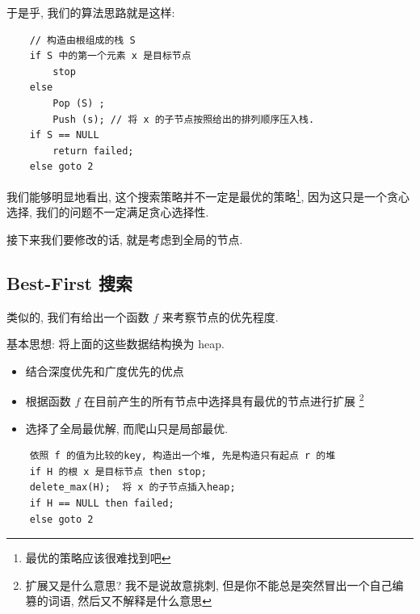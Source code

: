 \documentclass[a4paper, 10pt]{ctexart} %
\begin{document}
于是乎, 我们的算法思路就是这样:
\begin{verbatim}
    // 构造由根组成的栈 S
    if S 中的第一个元素 x 是目标节点
        stop
    else 
        Pop (S) ; 
        Push (s); // 将 x 的子节点按照给出的排列顺序压入栈.
    if S == NULL 
        return failed;
    else goto 2
\end{verbatim}

我们能够明显地看出, 这个搜索策略并不一定是最优的策略\footnote{最优的策略应该很难找到吧}, 因为这只是一个贪心选择, 我们的问题不一定满足贪心选择性. 

接下来我们要修改的话, 就是考虑到全局的节点.
\subsection{Best-First 搜索}

类似的, 我们有给出一个函数 $f$ 来考察节点的优先程度.

基本思想: 将上面的这些数据结构换为 heap.
\begin{itemize}
    \item 结合深度优先和广度优先的优点
    \item 根据函数 $f$ 在目前产生的所有节点中选择具有最优的节点进行扩展 \footnote{扩展又是什么意思? 我不是说故意挑刺, 但是你不能总是突然冒出一个自己编篡的词语, 然后又不解释是什么意思}
    \item 选择了全局最优解, 而爬山只是局部最优.
\end{itemize}
\begin{verbatim}
    依照 f 的值为比较的key, 构造出一个堆, 先是构造只有起点 r 的堆
    if H 的根 x 是目标节点 then stop;
    delete_max(H);  将 x 的子节点插入heap;
    if H == NULL then failed;
    else goto 2
\end{verbatim}
\end{document}
